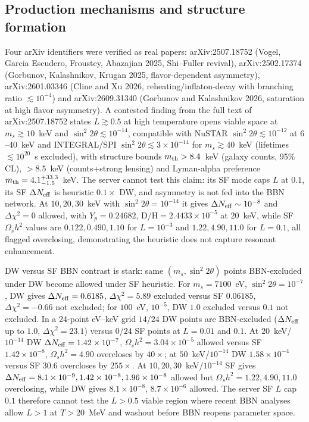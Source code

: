 \documentclass[11pt,a4paper]{article}
\begin{document}
\subsection{Production mechanisms and structure formation}
Four arXiv identifiers were verified as real papers: arXiv:2507.18752 (Vogel, Garcia Escudero, Froustey, Abazajian 2025, Shi--Fuller revival), arXiv:2502.17374 (Gorbunov, Kalashnikov, Krugan 2025, flavor-dependent asymmetry), arXiv:2601.03346 (Cline and Xu 2026, reheating/inflaton-decay with branching ratio $\lesssim10^{-4}$) and arXiv:2609.31340 (Gorbunov and Kalashnikov 2026, saturation at high flavor asymmetry). A contested finding from the full text of arXiv:2507.18752 states $L\gtrsim0.5$ at high temperature opens viable space at $m_{s}\gtrsim10$~keV and $\sin^{2}2\theta\lesssim10^{-14}$, compatible with NuSTAR $\sin^{2}2\theta\lesssim10^{-12}$ at $6$--40~keV and INTEGRAL/SPI $\sin^{2}2\theta\lesssim3\times10^{-14}$ for $m_{s}\gtrsim40$~keV (lifetimes $\lesssim10^{20}$~s excluded), with structure bounds $m_{\rm th}>8.4$~keV (galaxy counts, 95\% CL), $>8.5$~keV (counts+strong lensing) and Lyman-alpha preference $m_{\rm th}=4.1^{+33.3}_{-1.5}$~keV. The server cannot test this claim: its SF mode caps $L$ at $0.1$, its SF $\Delta N_{\rm eff}$ is heuristic $0.1\times$ DW, and asymmetry is not fed into the BBN network. At $10,20,30$~keV with $\sin^{2}2\theta=10^{-14}$ it gives $\Delta N_{\rm eff}\sim10^{-8}$ and $\Delta\chi^{2}=0$ allowed, with $Y_{p}=0.24682$, D/H$=2.4433\times10^{-5}$ at $20$~keV, while SF $\Omega_{s}h^{2}$ values are $0.122,0.490,1.10$ for $L=10^{-3}$ and $1.22,4.90,11.0$ for $L=0.1$, all flagged overclosing, demonstrating the heuristic does not capture resonant enhancement.

DW versus SF BBN contrast is stark: same $(m_{s},\sin^{2}2\theta)$ points BBN-excluded under DW become allowed under SF heuristic. For $m_{s}=7100$~eV, $\sin^{2}2\theta=10^{-7}$, DW gives $\Delta N_{\rm eff}=0.6185$, $\Delta\chi^{2}=5.89$ excluded versus SF $0.06185$, $\Delta\chi^{2}=-0.66$ not excluded; for $100$~eV, $10^{-5}$, DW $1.0$ excluded versus $0.1$ not excluded. In a 24-point eV--keV grid $14/24$ DW points are BBN-excluded ($\Delta N_{\rm eff}$ up to $1.0$, $\Delta\chi^{2}=23.1$) versus $0/24$ SF points at $L=0.01$ and $0.1$. At $20$~keV/$10^{-14}$ DW $\Delta N_{\rm eff}=1.42\times10^{-7}$, $\Omega_{s}h^{2}=3.04\times10^{-5}$ allowed versus SF $1.42\times10^{-8}$, $\Omega_{s}h^{2}=4.90$ overcloses by $40\times$; at $50$~keV/$10^{-14}$ DW $1.58\times10^{-4}$ versus SF $30.6$ overcloses by $255\times$. At $10,20,30$~keV/$10^{-14}$ SF gives $\Delta N_{\rm eff}=8.1\times10^{-9},1.42\times10^{-8},1.96\times10^{-8}$ allowed but $\Omega_{s}h^{2}=1.22,4.90,11.0$ overclosing, while DW gives $8.1\times10^{-8}$, $8.7\times10^{-6}$ allowed. The server SF $L$ cap $0.1$ therefore cannot test the $L>0.5$ viable region where recent BBN analyses allow $L>1$ at $T>20$~MeV and washout before BBN reopens parameter space.
\end{document}
